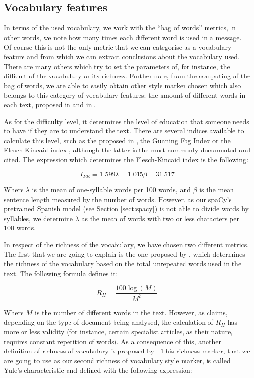 \subsection{Vocabulary features}\label{ssect:vocabf}

In terms of the used vocabulary, we work with the ``bag of words'' metrics, in other words, we note how many times each different word is used in a message. Of course this is not the only metric that we can categorise as a vocabulary feature and from which we can extract conclusions about the vocabulary used. There are many others which try to set the parameters of, for instance, the difficult of the vocabulary or its richness. Furthermore, from the computing of the bag of words, we are able to easily obtain other style marker chosen which also belongs to this category of vocabulary features: the amount of different words in each text, proposed in \cite{ril2014determination} and in \cite{corney2001identifying}.

As for the difficulty level, it determines the level of education that someone needs to have if they are to understand the text. There are several indices available to calculate this level, such as the proposed in \cite{dale1948formula}, the Gunning Fog Index \citep{wiki:gunning} or the Flesch-Kincaid index \citep{dubay2004principles}, although the latter is the most commonly documented and cited. The expression which determines the Flesch-Kincaid index is the following:

$$
I_{FK} = 1.599\lambda-1.015\beta-31.517
$$

Where $\lambda$ is the mean of one-syllable words per 100 words, and $\beta$ is the mean sentence length measured by the number of words. However, as our spaCy's pretrained Spanish model (see Section \ref{sect:spacy}) is not able to divide words by syllables, we determine $\lambda$ as the mean of words with two or less characters per 100 words.

In respect of the richness of the vocabulary, we have chosen two different metrics. The first that we are going to explain is the one proposed by \cite{honore1979some}, which determines the richness of the vocabulary based on the total unrepeated words used in the text. The following formula defines it:

$$
R_H = \frac{100\log(M)}{M^2}
$$

Where $M$ is the number of different words in the text. However, as \cite{ril2014determination} claims, depending on the type of document being analysed, the calculation of $R_H$ has more or less validity (for instance, certain specialist articles, as their nature, requires constant repetition of words). As a consequence of this, another definition of richness of vocabulary is proposed by \cite{yule2014statistical}. This richness marker, that we are going to use as our second richness of vocabulary style marker, is called Yule's characteristic and defined with the following expression:

